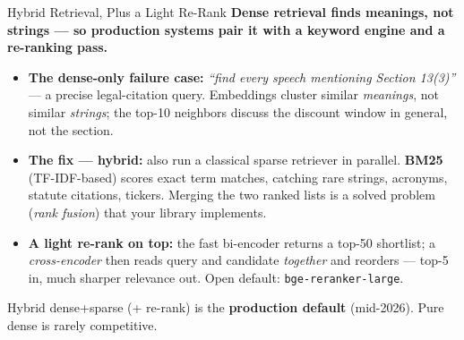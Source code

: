 \begin{frame}{Hybrid Retrieval, Plus a Light Re-Rank}
\textbf{Dense retrieval finds meanings, not strings --- so production systems pair it with a keyword engine and a re-ranking pass.}

\smallskip
\begin{itemize}
\item \textbf{The dense-only failure case:} \emph{``find every speech mentioning Section 13(3)''} --- a precise legal-citation query. Embeddings cluster similar \emph{meanings}, not similar \emph{strings}; the top-10 neighbors discuss the discount window in general, not the section.

\smallskip
\item \textbf{The fix --- hybrid:} also run a classical sparse retriever in parallel. \textbf{BM25} (TF-IDF-based) scores exact term matches, catching rare strings, acronyms, statute citations, tickers. Merging the two ranked lists is a solved problem (\emph{rank fusion}) that your library implements.

\smallskip
\item \textbf{A light re-rank on top:} the fast bi-encoder returns a top-50 shortlist; a \emph{cross-encoder} then reads query and candidate \emph{together} and reorders --- top-5 in, much sharper relevance out. Open default: \texttt{bge-reranker-large}.
\end{itemize}

\smallskip
\begin{takeawaybox}
Hybrid dense+sparse (+ re-rank) is the \textbf{production default} (mid-2026). Pure dense is rarely competitive.
\end{takeawaybox}
\end{frame}

